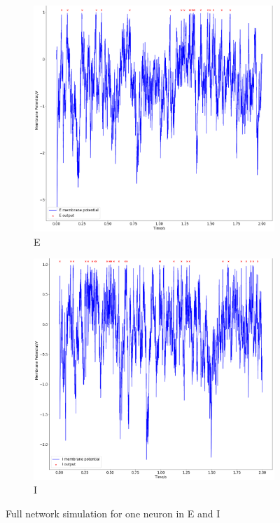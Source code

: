 \documentclass[twoside,twocolumn]{article}
\begin{document}
\begin{figure}[h]
  \centering
  \begin{subfigure}[t]{0.4\textwidth}
    \includegraphics[width=\linewidth]{e}
  \caption{E} 
  \label{sub:E}
  \end{subfigure}
  \begin{subfigure}[t]{0.4\textwidth}
    \includegraphics[width=\linewidth]{i}
  \caption{I}
  \label{sub:I}
  \end{subfigure}
  \caption{Full network simulation for one neuron in E and I}
  \label{fig:fn}
\end{figure}
\end{document}
